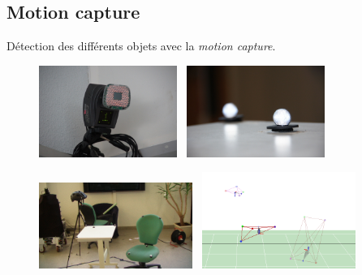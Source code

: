 \documentclass{beamer}
\begin{document}
\subsection*{Motion capture}
\begin{frame}
  \center Détection des différents objets avec la \textit{motion capture}.\\
   \begin{figure}
    \includegraphics[width=4.5cm]{./images/IR.jpg}~
    \includegraphics[width=4.5cm]{./images/marker_flash.jpg}
  \end{figure}
  \vspace{-5mm}
  \begin{figure}
    \includegraphics[width=5cm]{./images/mocap_real.jpg}~
    \includegraphics[width=5cm]{./images/mocap.png}
  \end{figure}
\end{frame}
\end{document}
